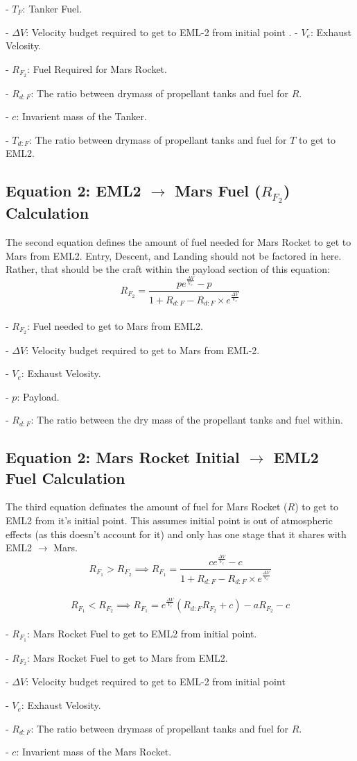 \documentclass[10pt,a4paper, twocolumn]{article}
\begin{document}
- $T_F$: Tanker Fuel.

- $\Delta V$: Velocity budget required to get to EML-2 from initial point
.
- $V_e$: Exhaust Velosity.

- $R_{F_2}$: Fuel Required for Mars Rocket.

- $R_{d:F}$: The ratio between drymass of propellant tanks and fuel for $R$.

- $c$: Invarient mass of the Tanker.

- $T_{d:F}$: The ratio between drymass of propellant tanks and fuel for $T$ to get to EML2. 

\subsection{Equation 2: EML2 $\rightarrow$ Mars Fuel ($R_{F_2}$) Calculation}
\noindent The second equation defines the amount of fuel needed for Mars Rocket to get to Mars from EML2. Entry, Descent, and Landing should not be factored in here. Rather, that should be the craft within the payload section of this equation: \\

$$R_{F_2}=\frac{pe^{\frac{\Delta V}{V_e}} - p}{1+R_{d:F}-R_{d:F}\times e^{\frac{\Delta V}{V_e}}}$$ \\

- $R_{F_2}$: Fuel needed to get to Mars from EML2.

- $\Delta V$: Velocity budget required to get to Mars from EML-2.

- $V_e$: Exhaust Velosity.

- $p$: Payload.

- $R_{d:F}$: The ratio between the dry mass of the propellant tanks and fuel within.

\subsection{Equation 2: Mars Rocket Initial $\rightarrow$ EML2 Fuel Calculation}
\noindent The third equation definates the amount of fuel for Mars Rocket ($R$) to get to EML2 from it's initial point. This assumes initial point is out of atmospheric effects (as this doesn't account for it) and only has one stage that it shares with EML2 $\rightarrow$ Mars. \\

$$R_{F_1} > R_{F_2} \implies R_{F_1} = \frac{ce^{\frac{\Delta V}{V_e}}-c}{1+R_{d:F}-R_{d:F} \times e^{\frac{\Delta V}{V_e}}}$$ \\

$$R_{F_1} < R_{F_2} \implies R_{F_1} = e^{\frac{\Delta V}{V_e}}(R_{d:F}R_{F_2}+c)-aR_{F_2}-c$$ \\

- $R_{F_1}$: Mars Rocket Fuel to get to EML2 from initial point.

- $R_{F_2}$: Mars Rocket Fuel to get to Mars from EML2.

- $\Delta V$: Velocity budget required to get to EML-2 from initial point

- $V_e$: Exhaust Velosity.

- $R_{d:F}$: The ratio between drymass of propellant tanks and fuel for $R$.

- $c$: Invarient mass of the Mars Rocket.
\end{document}
